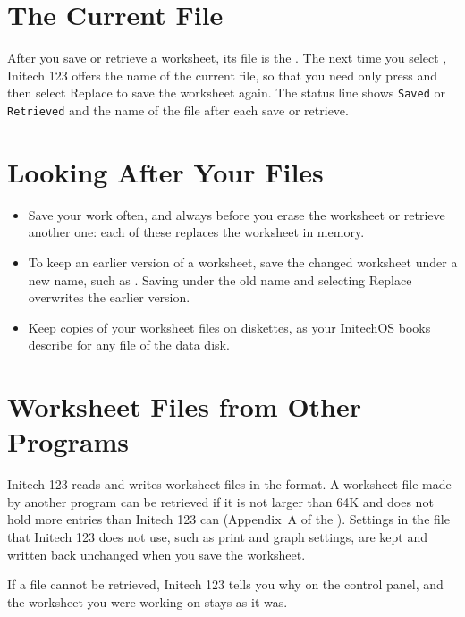 \section{The Current File}
After you save or retrieve a worksheet, its file is the .  The next time you select , Initech 123 offers
the name of the current file, so that you need only press 
and then select Replace to save the worksheet again.  The status line
shows \texttt{Saved} or \texttt{Retrieved} and the name of the file after
each save or retrieve.

\section{Looking After Your Files}
\begin{itemize}
\item Save your work often, and always before you erase the worksheet or
  retrieve another one: each of these replaces the worksheet in memory.
\item To keep an earlier version of a worksheet, save the changed worksheet
  under a new name, such as .  Saving under the old name
  and selecting Replace overwrites the earlier version.
\item Keep copies of your worksheet files on diskettes, as your InitechOS
  books describe for any file of the data disk.
\end{itemize}

\section{Worksheet Files from Other Programs}
Initech 123 reads and writes worksheet files in the  format.
A  worksheet file made by another program can be retrieved if
it is not larger than 64K and does not hold more entries than Initech 123
can (Appendix~A of the ).  Settings in the
file that Initech 123 does not use, such as print and graph settings, are
kept and written back unchanged when you save the worksheet.

If a file cannot be retrieved, Initech 123 tells you why on the control
panel, and the worksheet you were working on stays as it was.
